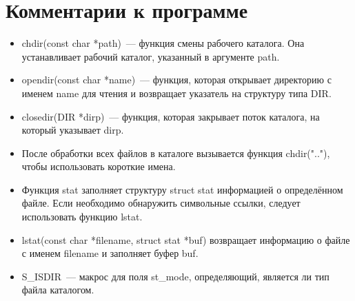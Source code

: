 \section{Комментарии к программе}
\begin{itemize}
    \item chdir(const char *path)~--- функция смены рабочего каталога. Она устанавливает рабочий каталог, указанный в аргументе path.
    \item opendir(const char *name)~--- функция, которая открывает директорию с именем name для чтения и возвращает указатель на структуру типа DIR.
    \item closedir(DIR *dirp)~--- функция, которая закрывает поток каталога, на который указывает dirp.
    \item После обработки всех файлов в каталоге вызывается функция chdir(".."), чтобы использовать короткие имена.
    \item Функция stat заполняет структуру struct stat информацией о определённом файле. Если необходимо обнаружить символьные ссылки, следует использовать функцию lstat.
    \item lstat(const char *filename, struct stat *buf) возвращает информацию о файле с именем filename и заполняет буфер buf.
    \item S\_ISDIR~--- макрос для поля st\_mode, определяющий, является ли тип файла каталогом.
\end{itemize}

